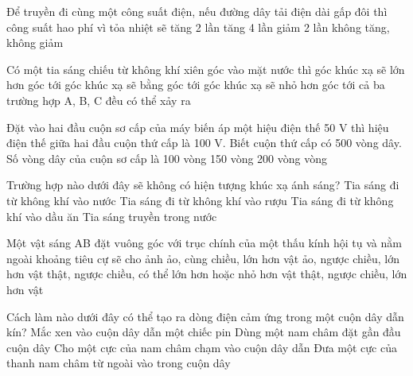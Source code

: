 \begin{ex}
	Để truyền đi cùng một công suất điện, nếu đường dây tải điện dài gấp đôi thì công suất hao phí vì tỏa nhiệt sẽ
	\choice
	{\True tăng 2 lần}
	{tăng 4 lần}
	{giảm 2 lần}
	{không tăng, không giảm}
	\loigiai{}
\end{ex}

\begin{ex}
	Có một tia sáng chiếu từ không khí xiên góc vào mặt nước thì
	\choice
	{góc khúc xạ sẽ lớn hơn góc tới}
	{góc khúc xạ sẽ bằng góc tới}
	{\True góc khúc xạ sẽ nhỏ hơn góc tới}
	{cả ba trường hợp A, B, C đều có thể xảy ra}
	\loigiai{}
\end{ex}

\begin{ex}
	Đặt vào hai đầu cuộn sơ cấp của máy biến áp một hiệu điện thế 50 V thì hiệu điện thế giữa hai đầu cuộn thứ cấp là 100 V. Biết cuộn thứ cấp có 500 vòng dây. Số vòng dây của cuộn sơ cấp là
	\choice
	{100 vòng}
	{150 vòng}
	{200 vòng}
	{ vòng}
	\loigiai{}
\end{ex}

\begin{ex}
	Trường hợp nào dưới đây sẽ không có hiện tượng khúc xạ ánh sáng?
	\choice
	{Tia sáng đi từ không khí vào nước}
	{Tia sáng đi từ không khí vào rượu}
	{Tia sáng đi từ không khí vào dầu ăn}
	{\True Tia sáng truyền trong nước}
	\loigiai{}
\end{ex}

\begin{ex}
	Một vật sáng AB đặt vuông góc với trục chính của một thấu kính hội tụ và nằm ngoài khoảng tiêu cự sẽ cho ảnh
	\choice
	{ảo, cùng chiều, lớn hơn vật}
	{ảo, ngược chiều, lớn hơn vật}
	{\True thật, ngược chiều, có thể lớn hơn hoặc nhỏ hơn vật}
	{thật, ngược chiều, lớn hơn vật}
	\loigiai{}
\end{ex}

\begin{ex}
	Cách làm nào dưới đây có thể tạo ra dòng điện cảm ứng trong một cuộn dây dẫn kín?
	\choice
	{Mắc xen vào cuộn dây dẫn một chiếc pin}
	{Dùng một nam châm đặt gần đầu cuộn dây}
	{Cho một cực của nam châm chạm vào cuộn dây dẫn}
	{\True Đưa một cực của thanh nam châm từ ngoài vào trong cuộn dây}
	\loigiai{}
\end{ex}

